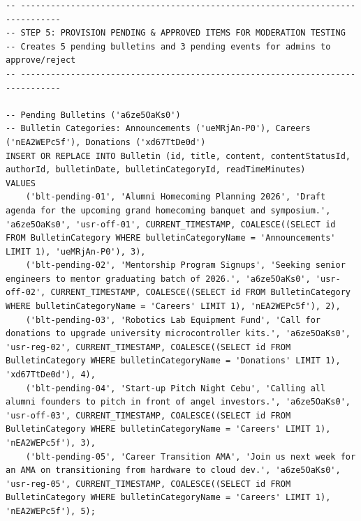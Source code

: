 \documentclass[11pt,letterpaper]{article}
\begin{document}
\begin{lstlisting}
-- ------------------------------------------------------------------------------
-- STEP 5: PROVISION PENDING & APPROVED ITEMS FOR MODERATION TESTING
-- Creates 5 pending bulletins and 3 pending events for admins to approve/reject
-- ------------------------------------------------------------------------------

-- Pending Bulletins ('a6ze5OaKs0')
-- Bulletin Categories: Announcements ('ueMRjAn-P0'), Careers ('nEA2WEPc5f'), Donations ('xd67TtDe0d')
INSERT OR REPLACE INTO Bulletin (id, title, content, contentStatusId, authorId, bulletinDate, bulletinCategoryId, readTimeMinutes)
VALUES 
    ('blt-pending-01', 'Alumni Homecoming Planning 2026', 'Draft agenda for the upcoming grand homecoming banquet and symposium.', 'a6ze5OaKs0', 'usr-off-01', CURRENT_TIMESTAMP, COALESCE((SELECT id FROM BulletinCategory WHERE bulletinCategoryName = 'Announcements' LIMIT 1), 'ueMRjAn-P0'), 3),
    ('blt-pending-02', 'Mentorship Program Signups', 'Seeking senior engineers to mentor graduating batch of 2026.', 'a6ze5OaKs0', 'usr-off-02', CURRENT_TIMESTAMP, COALESCE((SELECT id FROM BulletinCategory WHERE bulletinCategoryName = 'Careers' LIMIT 1), 'nEA2WEPc5f'), 2),
    ('blt-pending-03', 'Robotics Lab Equipment Fund', 'Call for donations to upgrade university microcontroller kits.', 'a6ze5OaKs0', 'usr-reg-02', CURRENT_TIMESTAMP, COALESCE((SELECT id FROM BulletinCategory WHERE bulletinCategoryName = 'Donations' LIMIT 1), 'xd67TtDe0d'), 4),
    ('blt-pending-04', 'Start-up Pitch Night Cebu', 'Calling all alumni founders to pitch in front of angel investors.', 'a6ze5OaKs0', 'usr-off-03', CURRENT_TIMESTAMP, COALESCE((SELECT id FROM BulletinCategory WHERE bulletinCategoryName = 'Careers' LIMIT 1), 'nEA2WEPc5f'), 3),
    ('blt-pending-05', 'Career Transition AMA', 'Join us next week for an AMA on transitioning from hardware to cloud dev.', 'a6ze5OaKs0', 'usr-reg-05', CURRENT_TIMESTAMP, COALESCE((SELECT id FROM BulletinCategory WHERE bulletinCategoryName = 'Careers' LIMIT 1), 'nEA2WEPc5f'), 5);


\end{lstlisting}
\end{document}
